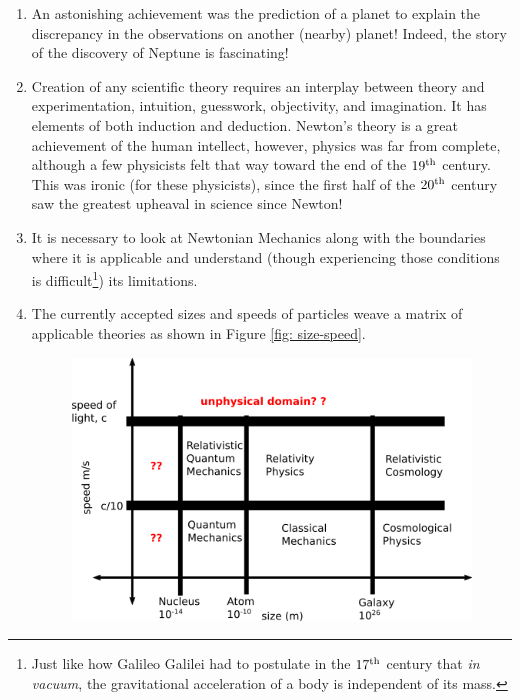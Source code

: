 \documentclass[12pt,a4paper]{book}
\begin{document}
\begin{enumerate}
        \begin{enumerate}
            \item The bulging of earth and Jupiter because of their rotation.
            \item The variation of \emph{acceleration due to gravity} with the latitude\footnote{The small circle parallel to the great equatorial circle.}.
            \item The generation of tides on earth by the combined action of sun and moon.
            \item The paths of comets through the solar system.
            \item The slow but steady change in the direction of earth's axis.
        \end{enumerate}

    \item An astonishing achievement was the prediction of a planet to explain the discrepancy in the observations on another (nearby) planet! Indeed, the story of the discovery \cite{neptune} of Neptune is fascinating!
    \item Creation of any scientific theory requires an interplay between theory and experimentation, intuition, guesswork, objectivity, and imagination. It has elements of both induction and deduction. Newton's theory is a great achievement of the human intellect, however, physics was far from complete, although a few physicists felt that way toward the end of the $19\textsuperscript{th}$ century. This was ironic (for these physicists), since the first half of the $20\textsuperscript{th}$ century saw the greatest upheaval in science since Newton!
    \item It is necessary to look at Newtonian Mechanics along with the boundaries where it is applicable and understand (though experiencing those conditions is difficult\footnote{Just like how Galileo Galilei had to postulate in the $17\textsuperscript{th}$ century that \emph{in vacuum}, the gravitational acceleration of a body is independent of its mass.}) its limitations.
    \item The currently accepted sizes and speeds of particles weave a matrix of applicable theories as shown in Figure \ref{fig: size-speed}.
        \begin{figure}[h!]
            \centering
            \includegraphics[width=0.5\linewidth]{size-speed.png}

\end{figure}
\end{enumerate}
\end{document}
